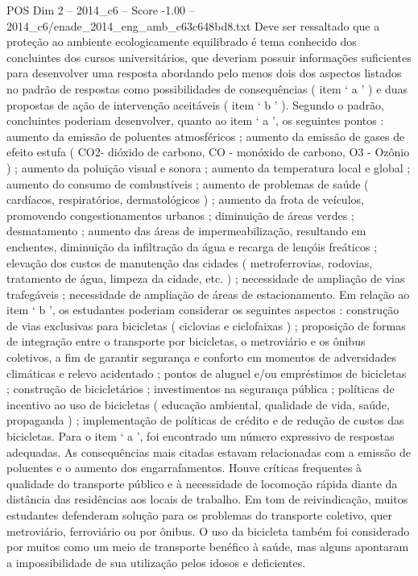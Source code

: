 \begin{textsample}{POS Dim 2 – 2014\_c6 – Score -1.00 – 2014\_c6/enade\_2014\_eng\_amb\_c63c648bd8.txt}
Deve ser ressaltado que a proteção ao ambiente ecologicamente equilibrado é tema conhecido dos concluintes dos cursos universitários, que deveriam possuir informações suficientes para desenvolver uma resposta abordando pelo menos dois dos aspectos listados no padrão de respostas como possibilidades de consequências ( item ‘ a ’ ) e duas propostas de ação de intervenção aceitáveis ( item ‘ b ’ ).
Segundo o padrão, concluintes poderiam desenvolver, quanto ao item ‘ a ’, os seguintes pontos : aumento da emissão de poluentes atmosféricos ; aumento da emissão de gases de efeito estufa ( CO2- dióxido de carbono, CO - monóxido de carbono, O3 - Ozônio ) ; aumento da poluição visual e sonora ; aumento da temperatura local e global ; aumento do consumo de combustíveis ; aumento de problemas de saúde ( cardíacos, respiratórios, dermatológicos ) ; aumento da frota de veículos, promovendo congestionamentos urbanos ; diminuição de áreas verdes ; desmatamento ; aumento das áreas de impermeabilização, resultando em enchentes, diminuição da infiltração da água e recarga de lençóis freáticos ; elevação dos custos de manutenção das cidades ( metroferrovias, rodovias, tratamento de água, limpeza da cidade, etc. ) ; necessidade de ampliação de vias trafegáveis ; necessidade de ampliação de áreas de estacionamento.
Em relação ao item ‘ b ’, os estudantes poderiam considerar os seguintes aspectos : construção de vias exclusivas para bicicletas ( ciclovias e ciclofaixas ) ; proposição de formas de integração entre o transporte por bicicletas, o metroviário e os ônibus coletivos, a fim de garantir segurança e conforto em momentos de adversidades climáticas e relevo acidentado ; pontos de aluguel e/ou empréstimos de bicicletas ; construção de bicicletários ; investimentos na segurança pública ; políticas de incentivo ao uso de bicicletas ( educação ambiental, qualidade de vida, saúde, propaganda ) ; implementação de políticas de crédito e de redução de custos das bicicletas.
Para o item ‘ a ’, foi encontrado um número expressivo de respostas adequadas.
As consequências mais citadas estavam relacionadas com a emissão de poluentes e o aumento dos engarrafamentos.
Houve críticas frequentes à qualidade do transporte público e à necessidade de locomoção rápida diante da distância das residências aos locais de trabalho.
Em tom de reivindicação, muitos estudantes defenderam solução para os problemas do transporte coletivo, quer metroviário, ferroviário ou por ônibus.
O uso da bicicleta também foi considerado por muitos como um meio de transporte benéfico à saúde, mas alguns apontaram a impossibilidade de sua utilização pelos idosos e deficientes.

\end{textsample}
